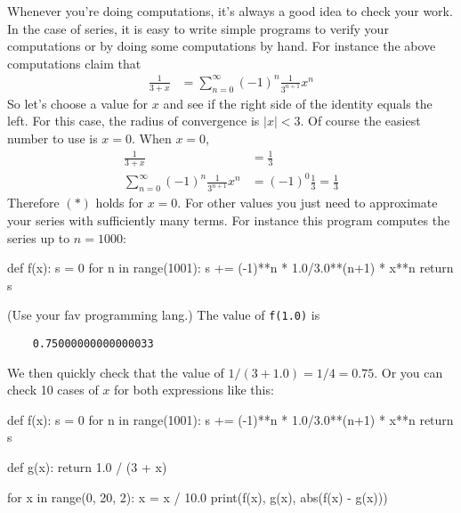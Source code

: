 Whenever you're doing computations,
it's always a good idea to check your work.
In the case of series, it is easy to write simple programs to
verify your computations or by doing some computations by hand.
For instance the above computations claim that
\begin{align*}
\frac{1}{3+x} 
&= \sum_{n=0}^\infty (-1)^n \frac{1}{3^{n+1}} x^n \tag{$*$}
\end{align*}
So let's choose a value for $x$ and see if the 
right side of the identity equals the left.
For this case, the radius of convergence is $|x| < 3$.
Of course the easiest number to use is $x = 0$.
When $x = 0$,
\begin{align*}
\frac{1}{3 + x} &= \frac{1}{3} \\
\sum_{n=0}^\infty (-1)^n \frac{1}{3^{n+1}}x^n &= (-1)^0 \frac{1}{3} = \frac{1}{3}
\end{align*}
%
Therefore $(*)$ holds for $x = 0$.
For other values you just need to approximate your series with
sufficiently many terms.
For instance this program computes the series up to $n = 1000$:
\begin{console}[fontsize=\footnotesize]
def f(x):
    s = 0
    for n in range(1001):
        s += (-1)**n * 1.0/3.0**(n+1) * x**n
    return s
\end{console}
(Use your fav programming lang.)
The value of \verb!f(1.0)! is
\begin{verbatim}
    0.75000000000000033
\end{verbatim}
We then quickly check that the value of $1/(3 + 1.0) = 1/4 = 0.75$.
Or you can check 10 cases of $x$ for both expressions like this:
\begin{console}[fontsize=\footnotesize]
def f(x):
    s = 0
    for n in range(1001):
        s += (-1)**n * 1.0/3.0**(n+1) * x**n
        return s
        
def g(x):
    return 1.0 / (3 + x)

for x in range(0, 20, 2):
    x = x / 10.0
    print(f(x), g(x), abs(f(x) - g(x)))
\end{console}

\newpage

